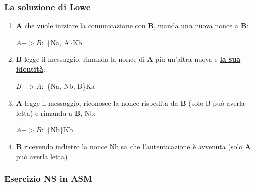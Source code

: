 \subsubsection{La soluzione di Lowe}
\begin{enumerate}
    \item \textbf{A} che vuole iniziare la comunicazione con \textbf{B}, manda una nuova nonce a \textbf{B}:
    \begin{center}
        $A->B :$ \{Na, A\}Kb
    \end{center}
    \item \textbf{B} legge il messaggio, rimanda la nonce di \textbf{A} più un'altra nuova e \underline{\textbf{la sua identità}}:
    \begin{center}
        $B->A :$ \{Na, Nb, B\}Ka
    \end{center}
    \item \textbf{A} legge il messaggio, riconosce la nonce rispedita da \textbf{B} (solo B può averla letta) e rimanda a \textbf{B}, Nb:
    \begin{center}
        $A->B :$ \{Nb\}Kb
    \end{center}
    \item \textbf{B} ricevendo indietro la nonce Nb sa che l'autenticazione è avvenuta (solo \textbf{A} può averla letta)
\end{enumerate}

\subsubsection{Esercizio NS in ASM}